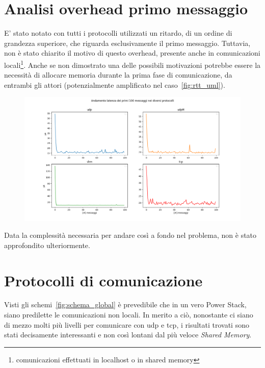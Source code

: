 \section{Analisi overhead primo messaggio}
E' stato notato con tutti i protocolli utilizzati un ritardo, di un ordine di grandezza superiore, che riguarda esclusivamente il primo messaggio. Tuttavia, non è stato chiarito il motivo di questo overhead, presente anche in comunicazioni locali\footnote{comunicazioni effettuati in localhost o in shared memory}. Anche se non dimostrato una delle possibili motivazioni potrebbe essere la necessità di allocare memoria durante la prima fase di comunicazione, da entrambi gli attori (potenzialmente amplificato nel caso~\ref{fig:rtt_uml}). 
\begin{figure}[H]
    \includegraphics[width=\textwidth]{./results/errortest.png} 
    \caption{} %
    \label{}
\end{figure}
Data la complessità necessaria per andare così a fondo nel problema, non è stato approfondito ulteriormente.

\section{Protocolli di comunicazione}
Visti gli schemi~\ref{fig:schema_global} è prevedibile che in un vero Power Stack, siano predilette le comunicazioni non locali. In merito a ciò, nonostante ci siano di mezzo molti più livelli per comunicare con udp e tcp, i risultati trovati sono stati decisamente interessanti e non così lontani dal più veloce \emph{Shared Memory}.

